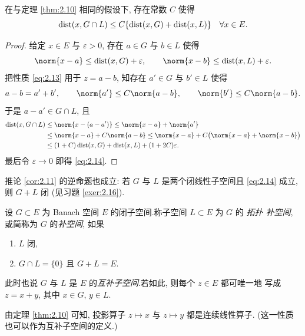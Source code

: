 \begin{starcorollary}
\label{cor:2.11}
在与定理  \ref{thm:2.10} 相同的假设下, 存在常数 $C$ 使得
\begin{equation}
\operatorname{dist}(x,G\cap L)\le C\{\operatorname{dist}(x,G)+\operatorname{dist}(x,L)\}\quad \forall x\in E.
\label{eq:2.14}
\end{equation}
\end{starcorollary}

\begin{proof}
给定 $x\in E$ 与 $\varepsilon>0$, 存在 $a\in G$ 与 $b\in L$ 使得
\begin{equation*}
\norm{x-a}\le\dist(x,G)+\varepsilon,\qquad
\norm{x-b}\le\dist(x,L)+\varepsilon.
\end{equation*}
把性质 \eqref{eq:2.13} 用于 $z=a-b$, 知存在 $a'\in G$ 与 $b'\in L$ 使得
\begin{equation*}
a-b=a'+b',\qquad \norm{a'}\le C\norm{a-b},\qquad \norm{b'}\le C\norm{a-b}.
\end{equation*}
于是 $a-a'\in G\cap L$, 且
\begin{align*}
\dist(x,G\cap L)&\le\norm{x-(a-a')}\le\norm{x-a}+\norm{a'}\\
&\le\norm{x-a}+C\norm{a-b}\le\norm{x-a}+C\bigl(\norm{x-a}+\norm{x-b}\bigr)\\
&\le(1+C)\dist(x,G)+\dist(x,L)+(1+2C)\varepsilon.
\end{align*}
最后令 $\varepsilon\to0$ 即得 \eqref{eq:2.14}.
\end{proof}

\begin{remark}
\label{rem:2.7}
推论  \ref{cor:2.11} 的逆命题也成立: 若 $G$ 与 $L$ 是两个闭线性子空间且
\eqref{eq:2.14} 成立, 则 $G+L$ 闭 (见习题  \ref{exer:2.16}).
\end{remark}

\begin{definition}
设 $G\subset E$ 为 Banach 空间 $E$ 的闭子空间.称子空间 $L\subset E$ 为 $G$ 的
\emph{拓扑
补空间}, 或简称为 $G$ 的\emph{补空间}, 如果
\begin{enumerate}[label=(\roman*), leftmargin=2.4em, itemsep=0.15em]
	\item $L$ 闭,
	\item $G\cap L=\{0\}$ 且 $G+L=E$.
\end{enumerate}
此时也说 $G$ 与 $L$ 是 $E$ 的\emph{互补子空间}.若如此, 则每个 $z\in E$ 都可唯一地
写成 $z=x+y$, 其中 $x\in G$, $y\in L$.

由定理  \ref{thm:2.10} 可知, 投影算子 $z\mapsto x$ 与 $z\mapsto y$ 都是连续线性算子.
(这一性质也可以作为互补子空间的定义.)
\end{definition}

